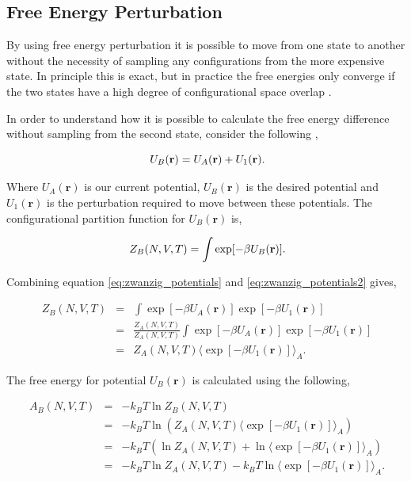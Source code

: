 \subsection{Free Energy Perturbation}

By using free energy perturbation it is possible to move from one state to another without the necessity of sampling any configurations from the more expensive state.  In principle this is exact, but in practice the free energies only converge if the two states have a high degree of configurational space overlap \cite{chipot_free_energy}.  

In order to understand how it is possible to calculate the free energy difference without sampling from the second state, consider the following \cite{Stat_mech},

\begin{equation} \label{eq:zwanzig_potentials}
\ U_B(\mathbf{r})=U_A (\mathbf{r}) + U_1(\mathbf{r}) \\.
\end{equation}

Where $U_A (\mathbf{r})$ is our current potential, $U_B (\mathbf{r})$ is the desired potential and $U_1 (\mathbf{r})$ is the perturbation required to move between these potentials.  The configurational partition function for $U_B (\mathbf{r})$ is,

\begin{equation}\label{eq:zwanzig_potentials2}
\ Z_{B}(N,V,T)= \int \exp [- \beta U_B (\mathbf{r})] \\.
\end{equation}

Combining equation \ref{eq:zwanzig_potentials} and \ref{eq:zwanzig_potentials2} gives,

\begin{eqnarray}
\ Z_{B}(N,V,T)&=& \int \exp [- \beta U_A (\mathbf{r})] \exp [- \beta U_1(\mathbf{r})] \\
\ &=& \frac{Z_{A}(N,V,T)}{Z_{A}(N,V,T)} \int \exp [- \beta U_A (\mathbf{r})] \exp [- \beta U_1(\mathbf{r})] \\
\ &=& Z_{A}(N,V,T) \langle \exp[- \beta U_{1}(\mathbf{r})] \rangle_{A} .
\end{eqnarray}

The free energy for potential $U_{B}(\mathbf{r})$ is calculated using the following,

\begin{eqnarray}
\ A_{B}(N,V,T) &=& -k_B T \ln Z_{B}(N,V,T) \\
\ &=& -k_B T \ln \left( Z_{A}(N,V,T) \langle \exp[- \beta U_{1}(\mathbf{r})] \rangle_{A}  \right) \\
\ &=& -k_B T \left( \ln Z_{A}(N,V,T) + \ln \langle \exp[- \beta U_{1}(\mathbf{r})] \rangle_{A} \right) \\
\ &=& -k_B T \ln Z_{A}(N,V,T) - k_B T \ln \langle \exp[- \beta U_{1}(\mathbf{r})] \rangle_{A} .
\end{eqnarray}

